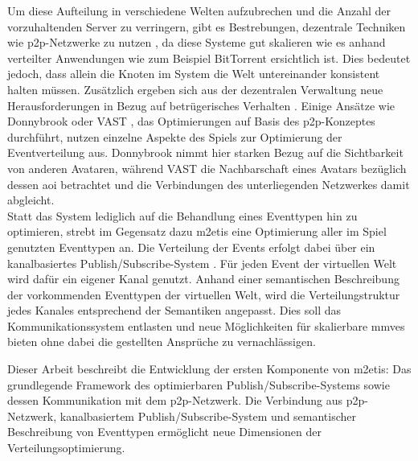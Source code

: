 Um diese Aufteilung in verschiedene Welten aufzubrechen und die Anzahl der vorzuhaltenden Server zu verringern, gibt es Bestrebungen, dezentrale Techniken wie \ac{p2p}-Netzwerke zu nutzen \cite{Knutsson2004Peertopeer, Triebel2008Peertopeer}, da diese Systeme gut skalieren wie es anhand verteilter Anwendungen wie zum Beispiel BitTorrent ersichtlich ist. Dies bedeutet jedoch, dass allein die Knoten im System die Welt untereinander konsistent halten müssen. Zusätzlich ergeben sich aus der dezentralen Verwaltung neue Herausforderungen in Bezug auf betrügerisches Verhalten \cite{Kabus2007Design}. Einige Ansätze wie Donnybrook \cite{Bharambe2008Donnybrook} oder VAST \cite{Backhaus2007Voronoibased}, das Optimierungen auf Basis des \ac{p2p}-Konzeptes durchführt, nutzen einzelne Aspekte des Spiels zur Optimierung der Eventverteilung aus. Donnybrook nimmt hier starken Bezug auf die Sichtbarkeit von anderen Avataren, während VAST die Nachbarschaft eines Avatars bezüglich dessen \ac{aoi} betrachtet und die Verbindungen des unterliegenden Netzwerkes damit abgleicht.\\
Statt das System lediglich auf die Behandlung eines Eventtypen hin zu optimieren, strebt im Gegensatz dazu \ac{m2etis} eine Optimierung aller im Spiel genutzten Eventtypen an. Die Verteilung der Events erfolgt dabei über ein kanalbasiertes Publish/Subscribe-System \cite{Fischer2010a}. Für jeden Event der virtuellen Welt wird dafür ein eigener Kanal genutzt. Anhand einer semantischen Beschreibung der vorkommenden Eventtypen der virtuellen Welt, wird die Verteilungstruktur jedes Kanales entsprechend der Semantiken angepasst. Dies soll das Kommunikationssystem entlasten und neue Möglichkeiten für skalierbare \acp{mmve} bieten ohne dabei die gestellten Ansprüche zu vernachlässigen.

Dieser Arbeit beschreibt die Entwicklung der ersten Komponente von \ac{m2etis}: Das grundlegende Framework des optimierbaren Publish/Subscribe-Systems sowie dessen Kommunikation mit dem \ac{p2p}-Netzwerk. Die Verbindung aus \ac{p2p}-Netzwerk, kanalbasiertem Publish/Subscribe-System und semantischer Beschreibung von Eventtypen ermöglicht neue Dimensionen der Verteilungsoptimierung.

